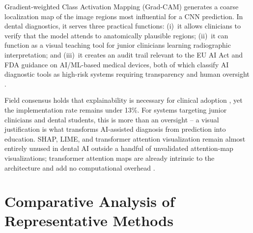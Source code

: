 \documentclass[conference]{IEEEtran}
\begin{document}
Gradient-weighted Class Activation Mapping (Grad-CAM) generates a
coarse localization map of the image regions most influential for a
CNN prediction. In dental diagnostics, it serves three practical
functions: (i)~it allows clinicians to verify that the model attends to
anatomically plausible regions; (ii)~it can function as a visual
teaching tool for junior clinicians learning radiographic interpretation;
and (iii)~it creates an audit trail relevant to the EU AI Act and FDA
guidance on AI/ML-based medical devices, both of which classify AI
diagnostic tools as high-risk systems requiring transparency and human
oversight \cite{chen2023deep}.

Field consensus holds that explainability is necessary for clinical
adoption
\cite{nassiri2025yolo,gamal2025automated,sastika2025ai,ferrara2025applications},
yet the implementation rate remains under 13\%. For systems targeting
junior clinicians and dental students, this is more than an oversight
-- a visual justification is what transforms AI-assisted diagnosis
from prediction into education. SHAP, LIME, and transformer attention
visualization remain almost entirely unused in dental AI outside a
handful of unvalidated attention-map visualizations; transformer
attention maps are already intrinsic to the architecture and add no
computational overhead \cite{bhoopalan2026self}.



\section{Comparative Analysis of Representative Methods}
\label{sec:comparison}
\end{document}
